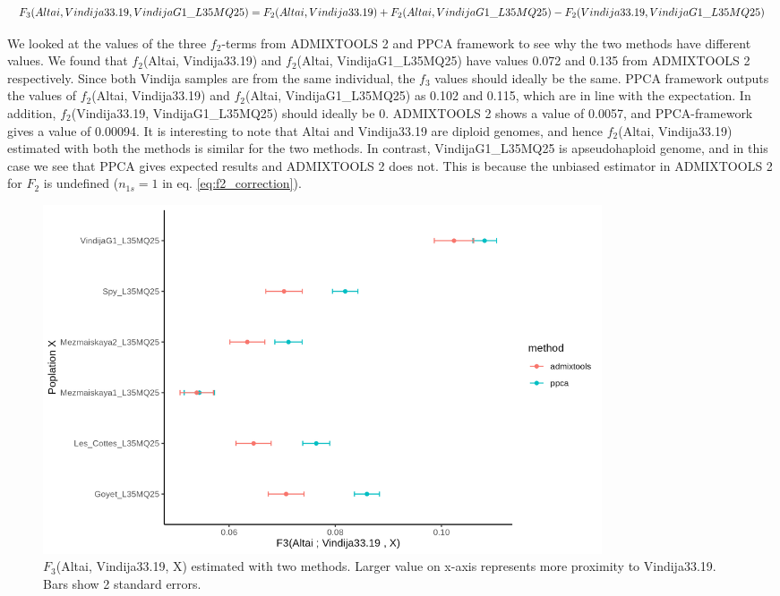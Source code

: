 \documentclass[12pt, letterpaper]{article}
\begin{document}
\begin{dmath}
    F_3(Altai, Vindija33.19, VindijaG1\_L35MQ25) = F_2(Altai, Vindija33.19) + F_2(Altai, VindijaG1\_L35MQ25) - F_2(Vindija33.19, VindijaG1\_L35MQ25)\\
\end{dmath}


We looked at the values of the three $f_2$-terms from ADMIXTOOLS 2 and PPCA framework to see why the two methods have different values. We found that $f_2$(Altai, Vindija33.19) and $f_2$(Altai, VindijaG1\_L35MQ25) have values 0.072 and 0.135 from ADMIXTOOLS 2 respectively. Since both Vindija samples are from the same individual, the $f_3$ values should ideally be the same. PPCA framework outputs the values of $f_2$(Altai, Vindija33.19) and $f_2$(Altai, VindijaG1\_L35MQ25) as 0.102 and 0.115, which are in line with the expectation. In addition, $f_2$(Vindija33.19, VindijaG1\_L35MQ25) should ideally be 0. ADMIXTOOLS 2 shows a value of 0.0057, and PPCA-framework gives a value of 0.00094. It is interesting to note that Altai and Vindija33.19 are diploid genomes, and hence $f_2$(Altai, Vindija33.19) estimated with both the methods is similar for the two methods. In contrast, VindijaG1\_L35MQ25 is apseudohaploid genome, and in this case we see that PPCA gives expected results and ADMIXTOOLS 2 does not. This is because the unbiased estimator in ADMIXTOOLS 2 for $F_2$ is undefined ($n_{1s}=1$ in eq. \ref{eq:f2_correction}). 

\begin{figure}[ht!]
    \includegraphics[width=16.5cm]{plots/f3_neandertal.png}
    \centering
    \caption{$F_3$(Altai, Vindija33.19, X) estimated with two methods. Larger value on x-axis represents more proximity to Vindija33.19. Bars show 2 standard errors.}
    \label{fig:nea_f3}
\end{figure}
\end{document}
